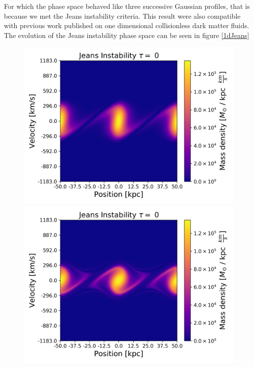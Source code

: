 For which the phase space behaved like three successive Gaussian profiles, that is because we met the Jeans instability criteria. This result were also compatible with previous work published on one dimensional collisionless dark matter fluids. The evolution of the Jeans instability phase space can be seen in figure \ref{1dJeans}


\begin{figure}[h!]
    \centering
    \includegraphics[scale=0.45]{imag/jeans7.png}
    \includegraphics[scale=0.45]{imag/jeans22.png}

\end{figure}
